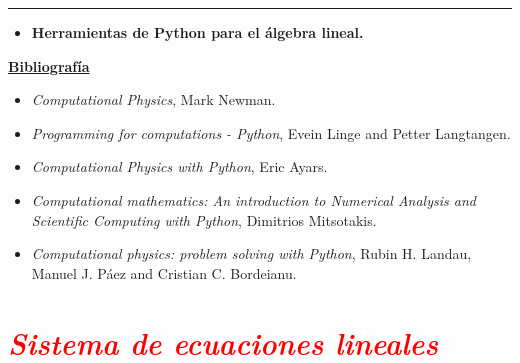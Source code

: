 \documentclass[12pt]{article}
\begin{document}
		\thispagestyle{firstpage}
		\vspace*{1.5cm}
	
	\begin{center}
		\rule{\textwidth}{0.4pt}
	\end{center}
	
	\begin{itemize}[leftmargin=*,label=\textcolor{red}{\ensuremath{\blacktriangleright}}]
		\item \textbf{Herramientas de Python para el álgebra lineal.}
	\end{itemize}
	
	\noindent
	\textbf{\underline{Bibliografía}}
	\begin{itemize}[leftmargin=*, label={\textcolor{blue}{$\bullet$}}]
	  \item \textit{Computational Physics}, Mark Newman.
      \item \textit{Programming for computations - Python}, Evein Linge and Petter Langtangen. 
      \item \textit{Computational Physics with Python}, Eric Ayars. 
      \item \textit{Computational mathematics: An introduction to Numerical Analysis and Scientific Computing  with Python},
      Dimitrios Mitsotakis. 
      \item \textit{Computational physics: problem solving with Python}, 
        Rubin H. Landau, Manuel J. Páez and Cristian C. Bordeianu.
    \end{itemize}
     

\section*{\textcolor{red}{\textit{Sistema de ecuaciones lineales}}}
\end{document}
